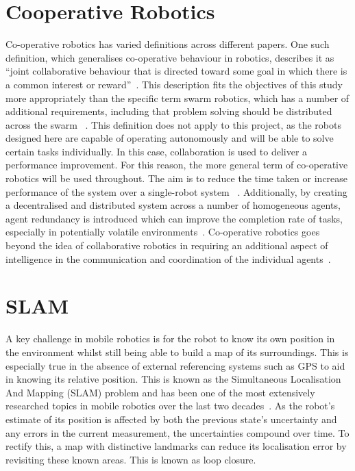 \section{Cooperative Robotics}\label{litreview/coop}
Co-operative robotics has varied definitions across different papers. One such
definition, which generalises co-operative behaviour in robotics, describes it 
as ``joint collaborative behaviour that is directed toward some goal in which 
there is a common interest or reward''~\cite{barnes1991behaviour}. This 
description fits the objectives of this study more appropriately than the 
specific term swarm robotics,  which has a number of additional requirements, 
including that problem solving should be distributed across the swarm~
\cite{sahin04}. This definition does not apply to this project, as the robots 
designed here are capable of operating autonomously and will be able to solve 
certain tasks individually. In this case, collaboration is used to deliver a 
performance improvement. For this reason, the more general term of co-operative 
robotics will be used throughout. The aim is to reduce the time taken or 
increase performance  of the system over a single-robot system~
\cite{premvuti1990consideration}. Additionally, by creating a decentralised and 
distributed system across a number of homogeneous agents, agent redundancy is 
introduced which can improve the completion rate of tasks, especially in 
potentially volatile environments~\cite{beckers1994local, parker95}.
Co-operative robotics goes beyond the idea of collaborative robotics in 
requiring an additional aspect of intelligence in the communication and 
coordination of the individual agents~\cite{cao1995cooperative}.

\section{SLAM}\label{litreview/slam}
A key challenge in mobile robotics is for the robot to know its own position in the
environment whilst still being able to build a map of its surroundings. 
This is especially true in the absence of external referencing systems
such as GPS to aid in knowing its relative position. This is known as the Simultaneous Localisation And Mapping (SLAM)
problem and has been one of the most extensively researched topics in mobile
robotics over the last two decades~\cite{grisetti2010tutorial}. As the robot's
estimate of its position is affected by both the previous state's uncertainty
and any errors in the current measurement, the uncertainties compound
over time. To rectify this, a map with distinctive landmarks can reduce its
localisation error by revisiting these known areas. This is known as loop closure.

